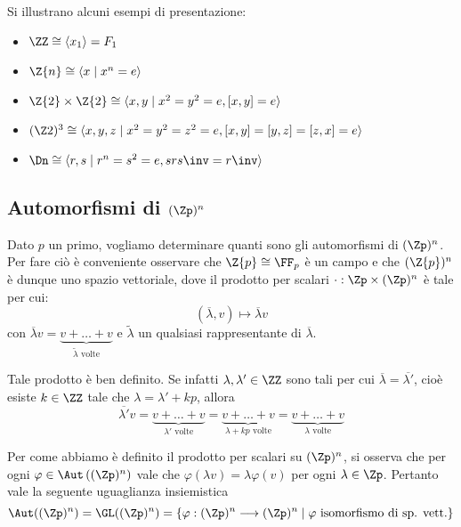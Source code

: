 \documentclass[11pt]{scrartcl}
\begin{document}
	\begin{example}
		Si illustrano alcuni esempi di presentazione:
		
		\begin{itemize}
			\item $\ZZ \cong \langle x_1 \rangle = F_1$
			\item $\Z{n} \cong \langle{x \mid x^n = e}\rangle$
			\item $\Z{2} \times \Z{2} \cong \langle{x, y \mid x^2 = y^2 = e, [x, y] = e}\rangle$
			\item $(\Z2)^3 \cong \langle x, y, z \mid x^2 = y^2 = z^2 = e, [x, y] = [y, z] = [z, x] = e \rangle$
			\item $\Dn \cong \langle{r, s \mid r^n = s^2 = e, srs\inv = r\inv}\rangle$
		\end{itemize}
	\end{example}
	
	\newpage
	
	\subsection{Automorfismi di \texorpdfstring{$(\Zp)^n$}{(Z/pZ)ⁿ}}
	\label{sez1.2}
	
	Dato $p$ un primo, vogliamo determinare quanti sono gli automorfismi di 
	$(\Zp)^n$. Per fare ciò è conveniente osservare che $\Z{p} \cong \FF_p$ è un campo e che
	$(\Z{p})^n$ è dunque uno spazio vettoriale, dove il prodotto per scalari $\cdot : \Zp\times (\Zp)^n$ è
	tale per cui:
	\[
	(\overline{\lambda}, v)\longmapsto \overline{\lambda}v
	\]
	con $\overline{\lambda}v = \underset{\tilde{\lambda}\text{ volte}}{\underbrace{v + \ldots + v}}$
	e $\tilde{\lambda}$ un qualsiasi rappresentante di $\overline{\lambda}$. \medskip
	
	
	Tale prodotto è ben definito. Se infatti $\lambda, \lambda' \in \ZZ$ sono tali per cui
	$\overline{\lambda} = \overline{\lambda'}$, cioè esiste $k \in \ZZ$ tale che
	$\lambda = \lambda' + kp$, allora \[
	\overline{\lambda'} v = \underset{\lambda'\text{ volte}}{\underbrace{v + \ldots + v}} = 
	\underset{\lambda + kp\text{ volte}}{\underbrace{v + \ldots + v}} = 
	\underset{\lambda\text{ volte}}{\underbrace{v + \ldots + v}}
	\]
	
	
	Per come abbiamo è definito il prodotto per scalari su $(\Zp)^n$, si osserva che per ogni
	$\varphi \in \Aut\left((\Zp)^n\right)$ vale che $\varphi(\lambda v) = \lambda\varphi(v)$ 
	per ogni $\lambda \in \Zp$. Pertanto vale la seguente uguaglianza insiemistica
	\[
	\Aut((\Zp)^n) = \GL((\Zp)^n) = \{\varphi: (\Zp)^n\longrightarrow(\Zp)^n
	\mid\varphi\text{ isomorfismo di sp. vett.}\}
	\]
	
\end{document}

